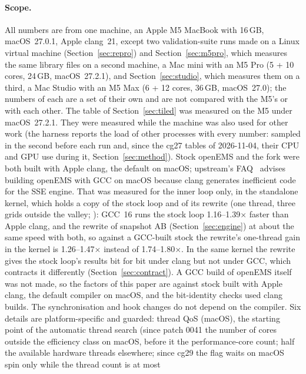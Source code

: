 \paragraph{Scope.} All numbers are from one machine, an Apple M5 MacBook with 16\,GB, macOS~27.0.1, Apple clang~21,
except two validation-suite runs made on a Linux virtual machine (Section~\ref{sec:repro}) and
Section~\ref{sec:m5pro}, which measures the same library files on a second machine, a Mac mini with an M5 Pro (5 + 10
cores, 24\,GB, macOS~27.2.1), and Section~\ref{sec:studio}, which measures them on a third, a Mac Studio with an M5 Max (6 + 12 cores,
36\,GB, macOS~27.0); the numbers of each are a set of their own and are not compared with the M5's or with each other. The table of
Section~\ref{sec:tiled} was measured on the M5 under macOS~27.2.1.
They were measured while the machine was also used for other work (the harness reports the load of other processes
with every number: sampled in the second before each run and, since the cg27 tables of 2026-11-04, their CPU and GPU
use during it,
Section~\ref{sec:method}). Stock openEMS and the fork were both built with Apple
clang, the default on macOS; upstream's FAQ~\cite{biergaizi29} advises building openEMS with GCC on macOS because
clang generates inefficient code for the SSE engine. That was measured for the inner loop only, in the standalone
kernel, which holds a copy of the stock loop and of its rewrite (one thread, three grids outside the valley;
): GCC~16 runs the stock loop 1.16--1.39$\times$ faster than
Apple clang, and the rewrite of snapshot AB (Section~\ref{sec:engine}) at about the same speed with both, so against
a GCC-built stock the rewrite's one-thread gain in the kernel is 1.26--1.47$\times$ instead of 1.74--1.80$\times$. In
the same kernel the rewrite gives the stock loop's results bit for bit under clang but not under GCC, which contracts
it differently (Section~\ref{sec:contract}). A GCC build of openEMS itself was not made, so the factors of this paper
are against stock built with Apple clang, the default compiler on macOS, and the bit-identity checks used clang builds.
The synchronisation and hook changes do not depend on the compiler. Six details are platform-specific and guarded:
thread QoS (macOS), the starting point of the automatic thread search (since patch 0041 the number of cores outside the efficiency class on
macOS, before it the performance-core count; half the available hardware threads elsewhere; since cg29 the flag waits on macOS spin only while the thread count is at most
